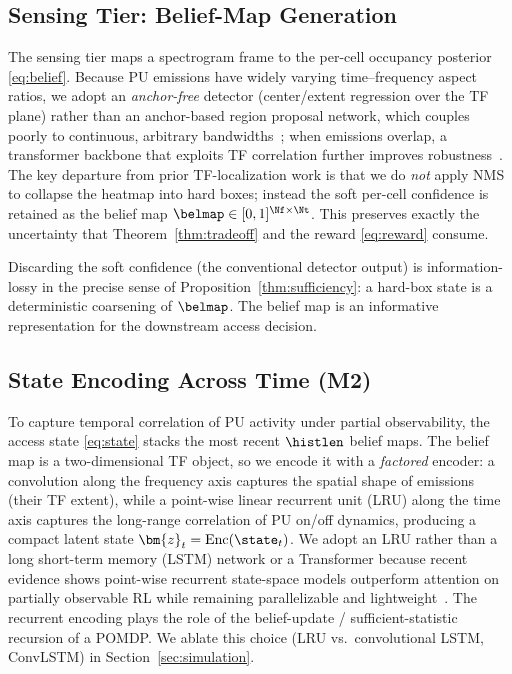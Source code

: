 \subsection{Sensing Tier: Belief-Map Generation}
\label{subsec:sensing_tier}
The sensing tier maps a spectrogram frame to the per-cell occupancy
posterior \eqref{eq:belief}. Because PU emissions have widely varying
time--frequency aspect ratios, we adopt an \emph{anchor-free} detector
(center/extent regression over the TF plane) rather than an anchor-based
region proposal network, which couples poorly to continuous, arbitrary
bandwidths~\cite{zhao2024uav}; when emissions overlap, a transformer backbone
that exploits TF correlation further improves
robustness~\cite{zhao2025trtfl_ssl}. The key departure from prior
TF-localization work is that we do \emph{not} apply NMS
to collapse the heatmap into hard boxes; instead the soft per-cell confidence
is retained as the belief map $\belmap\in[0,1]^{\Nf\times\Nt}$. This
preserves exactly the uncertainty that Theorem~\ref{thm:tradeoff} and the
reward \eqref{eq:reward} consume.

\begin{remark}
Discarding the soft confidence (the conventional detector output) is
information-lossy in the precise sense of Proposition~\ref{thm:sufficiency}: a
hard-box state is a deterministic coarsening of $\belmap$. The belief map is
an informative representation for the downstream access decision.
\end{remark}

\subsection{State Encoding Across Time (M2)}
\label{subsec:state_encoding}
To capture temporal correlation of PU activity under partial observability,
the access state \eqref{eq:state} stacks the most recent $\histlen$ belief
maps. The belief map is a two-dimensional TF object, so we encode it with a
\emph{factored} encoder: a convolution along the frequency axis captures the
spatial shape of emissions (their TF extent), while a point-wise linear
recurrent unit (LRU) along the time axis captures the long-range correlation
of PU on/off dynamics, producing a compact latent state
$\bm{z}_t = \mathrm{Enc}(\state_t)$. We adopt an LRU rather than a long
short-term memory (LSTM) network or a Transformer because recent evidence
shows point-wise recurrent state-space
models outperform attention on partially observable RL while remaining
parallelizable and lightweight~\cite{lu2024rethinking,morad2025cae}. The
recurrent encoding plays the role of the belief-update / sufficient-statistic
recursion of a POMDP. We ablate this choice (LRU vs.\ convolutional LSTM,
ConvLSTM) in Section~\ref{sec:simulation}.

